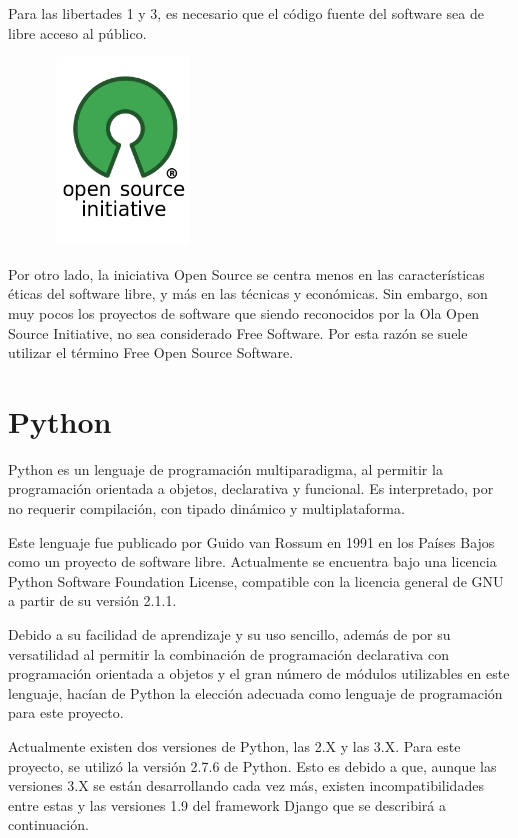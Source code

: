 \documentclass[a4paper, spanish, 12pt]{book}
\begin{document}
Para las libertades 1 y 3, es necesario que el c\'odigo fuente del software sea
de libre acceso al p\'ublico.

\begin{figure}[H]
  \centering
  \includegraphics[height=5cm, width=4cm, keepaspectratio]{img/Opensource}
\end{figure}

Por otro lado, la iniciativa Open Source se centra menos en las caracter\'isticas
\'eticas del software libre, y m\'as en las t\'ecnicas y econ\'omicas. Sin embargo,
son muy pocos los proyectos de software que siendo reconocidos por la Ola Open
Source Initiative, no sea considerado Free Software. Por esta raz\'on se suele
utilizar el t\'ermino Free Open Source Software.

\section{Python}
\label{sec:python}

Python es un lenguaje de programaci\'on multiparadigma, al permitir la programaci\'on
orientada a objetos, declarativa y funcional. Es interpretado, por no requerir
compilaci\'on, con tipado din\'amico y multiplataforma. ~\cite{python}

Este lenguaje fue publicado por Guido van Rossum en 1991 en los Pa\'ises Bajos
como un proyecto de software libre. Actualmente se encuentra bajo una licencia
Python Software Foundation License, compatible con la licencia general de GNU a partir
de su versi\'on 2.1.1.

Debido a su facilidad de aprendizaje y su uso sencillo, adem\'as de por su versatilidad
al permitir la combinaci\'on de programaci\'on declarativa con programaci\'on orientada
a objetos y el gran n\'umero de m\'odulos utilizables en este lenguaje, hac\'ian de Python
la elecci\'on adecuada como lenguaje de programaci\'on para este proyecto.

Actualmente existen dos versiones de Python, las 2.X y las 3.X. Para este proyecto,
se utiliz\'o la versi\'on 2.7.6 de Python. Esto es debido a que, aunque las versiones
3.X se est\'an desarrollando cada vez m\'as, existen incompatibilidades entre estas
y las versiones 1.9 del framework Django que se describir\'a a continuaci\'on.
\end{document}
